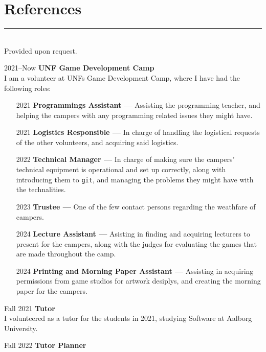 \documentclass[a4paper]{report}
\begin{document}
\section*{References}
\hrule width5cm \ \\
Provided upon request.

\fi
\iffalse
\vspace{1em}
\newbox\vsep
\setbox\vsep\hbox{\vrule height 2ex depth 16ex width 1pt}
\dp{}
\newcommand\showsep{\leavevmode\llap{\copy\vsep}}
\begin{cv}
\item[2021--Now] \textbf{UNF Game Development Camp}\\
    I am a volunteer at UNFs Game Development Camp, where I have had the following roles:
    \begin{itemize}[leftmargin=4em]
        \item[2021] \textbf{Programmings Assistant ---} Assisting the programming teacher, and
            helping the campers with any programming related issues they might have.
        \item[2021] \textbf{Logistics Responsible ---} In charge of handling the logistical
            requests of the other volunteers, and acquiring said logistics.
        \item[2022] \textbf{Technical Manager ---} In charge of making sure the campers'
            technical equipment is operational and set up correctly,
            along with introducing them to \texttt{git}, and managing
            the problems they might have with the technalities.
        \item[2023] \textbf{Trustee ---} One of the few contact persons regarding the weathfare of campers.
        \item[2024] \textbf{Lecture Assistant ---} Asisting in finding and acquiring lecturers to present for the campers, along with the judges for evaluating the games that are made throughout the camp.
        \item[2024] \textbf{Printing and Morning Paper Assistant ---} Assisting in acquiring permissions from game studios for artwork desiplys, and creating the morning paper for the campers.
    \end{itemize}
\item[Fall 2021]  \textbf{Tutor}\\
    I volunteered as a tutor for the students in 2021, studying Software at Aalborg University.
\item[Fall 2022] \textbf{Tutor Planner}\\

\end{cv}
\end{document}
